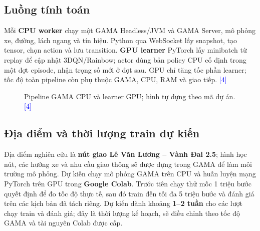 \documentclass[11pt,a4paper,headings=small,parskip=half]{scrartcl}
\newcommand{\src}[1]{\textcolor{blue}{[#1]}}
\begin{document}
\subsection{Luồng tính toán}
Mỗi \textbf{CPU worker} chạy một GAMA Headless/JVM và GAMA Server, mô phỏng xe, đường, lách ngang và tín hiệu. Python qua WebSocket lấy snapshot, tạo tensor, chọn action và lưu transition. \textbf{GPU learner} PyTorch lấy minibatch từ replay để cập nhật 3DQN/Rainbow; actor dùng bản policy CPU cố định trong một đợt episode, nhận trọng số mới ở đợt sau. GPU chỉ tăng tốc phần learner; tốc độ toàn pipeline còn phụ thuộc GAMA, CPU, RAM và giao tiếp. \src{4}
\begin{figure}[H]\centering
{}
\caption{Pipeline GAMA CPU và learner GPU; hình tự dựng theo mã dự án. \src{4}}
\end{figure}

\subsection{Địa điểm và thời lượng train dự kiến}
Địa điểm nghiên cứu là \textbf{nút giao Lê Văn Lương -- Vành Đai 2.5}; hình học nút, các hướng xe và nhu cầu giao thông sẽ được dựng trong GAMA để làm môi trường mô phỏng. Dự kiến chạy mô phỏng GAMA trên CPU và huấn luyện mạng PyTorch trên GPU trong \textbf{Google Colab}. Trước tiên chạy thử mốc 1 triệu bước quyết định để đo tốc độ thực tế, sau đó train đến tối đa 5 triệu bước và đánh giá trên các kịch bản đã tách riêng. Dự kiến dành khoảng \textbf{1--2 tuần} cho các lượt chạy train và đánh giá; đây là thời lượng kế hoạch, sẽ điều chỉnh theo tốc độ GAMA và tài nguyên Colab được cấp.
\end{document}
